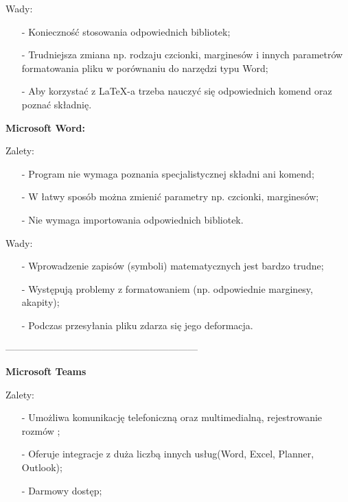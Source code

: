 \documentclass[a4paper,titleauthor]{mwart}
\begin{document}
	\indent
	
	Wady:
	\begin{itemize}
		
		
		\item[-]
		Konieczność stosowania odpowiednich bibliotek;
		
		\item[-]
		Trudniejsza zmiana np. rodzaju czcionki, marginesów i innych parametrów formatowania pliku w porównaniu do narzędzi typu Word;
		
		\item[-]
		Aby korzystać z LaTeX-a trzeba nauczyć się odpowiednich komend oraz poznać składnię.
	\end{itemize}
	
	\vspace{1cm}
	\textbf{Microsoft Word:}
	
	\indent
	
	Zalety:
	\begin{itemize}
		
		\item[-]
		Program nie wymaga poznania specjalistycznej składni ani komend;
		\item[-]
		W łatwy sposób można zmienić parametry np. czcionki, marginesów;
		\item[-]
		Nie wymaga importowania odpowiednich bibliotek.
	\end{itemize}
	
	\indent
	
	Wady:
	\begin{itemize}
		
		\item[-]
		Wprowadzenie zapisów (symboli) matematycznych jest bardzo trudne;
		\item[-]
		Występują problemy z formatowaniem (np. odpowiednie marginesy, akapity);
		\item[-]
		Podczas przesyłania pliku zdarza się jego deformacja.
	\end{itemize}
	
	------------------------------------------------------------\newline \newline
	 \newline 
	
	\textbf{Microsoft Teams} \newline
	\indent
	
	Zalety:
	\begin{itemize}
		
		\item[-]
		Umożliwa komunikację telefoniczną oraz multimedialną, rejestrowanie rozmów ;
		
		\item[-]
		Oferuje integracje z duża liczbą innych usług(Word, Excel, Planner, Outlook);
		
		\item[-]
		Darmowy dostęp;
		
		
	\end{itemize}
	
\end{document}
